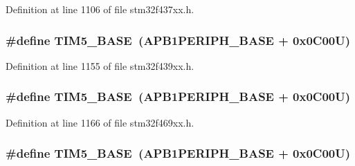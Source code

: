 Definition at line 1106 of file stm32f437xx.\+h.

\subsubsection[{\texorpdfstring{T\+I\+M5\+\_\+\+B\+A\+SE}{TIM5_BASE}}]{\setlength{\rightskip}{0pt plus 5cm}\#define T\+I\+M5\+\_\+\+B\+A\+SE~({\bf A\+P\+B1\+P\+E\+R\+I\+P\+H\+\_\+\+B\+A\+SE} + 0x0\+C00\+U)}\hypertarget{group___peripheral__memory__map_ga3e1671477190d065ba7c944558336d7e}{}\label{group___peripheral__memory__map_ga3e1671477190d065ba7c944558336d7e}


Definition at line 1155 of file stm32f439xx.\+h.

\subsubsection[{\texorpdfstring{T\+I\+M5\+\_\+\+B\+A\+SE}{TIM5_BASE}}]{\setlength{\rightskip}{0pt plus 5cm}\#define T\+I\+M5\+\_\+\+B\+A\+SE~({\bf A\+P\+B1\+P\+E\+R\+I\+P\+H\+\_\+\+B\+A\+SE} + 0x0\+C00\+U)}\hypertarget{group___peripheral__memory__map_ga3e1671477190d065ba7c944558336d7e}{}\label{group___peripheral__memory__map_ga3e1671477190d065ba7c944558336d7e}


Definition at line 1166 of file stm32f469xx.\+h.

\subsubsection[{\texorpdfstring{T\+I\+M5\+\_\+\+B\+A\+SE}{TIM5_BASE}}]{\setlength{\rightskip}{0pt plus 5cm}\#define T\+I\+M5\+\_\+\+B\+A\+SE~({\bf A\+P\+B1\+P\+E\+R\+I\+P\+H\+\_\+\+B\+A\+SE} + 0x0\+C00\+U)}\hypertarget{group___peripheral__memory__map_ga3e1671477190d065ba7c944558336d7e}{}\label{group___peripheral__memory__map_ga3e1671477190d065ba7c944558336d7e}


